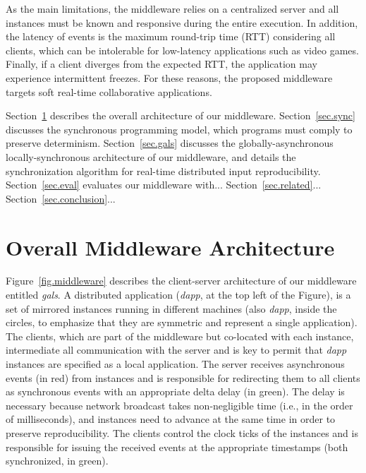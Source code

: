 \documentclass[sigplan,screen]{acmart}
\newcommand{\dapp}{\emph{dapp}\xspace}
\begin{document}
As the main limitations, the middleware relies on a centralized server and all
instances must be known and responsive during the entire execution.
In addition, the latency of events is the maximum round-trip time (RTT)
considering all clients, which can be intolerable for low-latency applications
such as video games.
Finally, if a client diverges from the expected RTT, the application may
experience intermittent freezes.
For these reasons, the proposed middleware targets soft real-time collaborative
applications.

Section~\ref{sec.arch} describes the overall architecture of our middleware.
Section~\ref{sec.sync} discusses the synchronous programming model, which
programs must comply to preserve determinism.
Section~\ref{sec.gals} discusses the globally-asynchronous locally-synchronous
architecture of our middleware, and details the synchronization algorithm for
real-time distributed input reproducibility.
Section~\ref{sec.eval} evaluates our middleware with...
Section~\ref{sec.related}...
Section~\ref{sec.conclusion}...

\section{Overall Middleware Architecture}
\label{sec.arch}

Figure~\ref{fig.middleware} describes the client-server architecture of our
middleware entitled \emph{gals}.
A distributed application (\dapp, at the top left of the Figure), is a set of
mirrored instances running in different machines (also \dapp, inside the
circles, to emphasize that they are symmetric and represent a single
application).
The clients, which are part of the middleware but co-located with each
instance, intermediate all communication with the server and is key to permit
that \dapp instances are specified as a local application.
The server receives asynchronous events (in red) from instances and is
responsible for redirecting them to all clients as synchronous events with an
appropriate delta delay (in green).
The delay is necessary because network broadcast takes non-negligible time
(i.e., in the order of milliseconds), and instances need to advance at the same
time in order to preserve reproducibility.
The clients control the clock ticks of the instances and is responsible for
issuing the received events at the appropriate timestamps (both synchronized,
in green).
\end{document}
